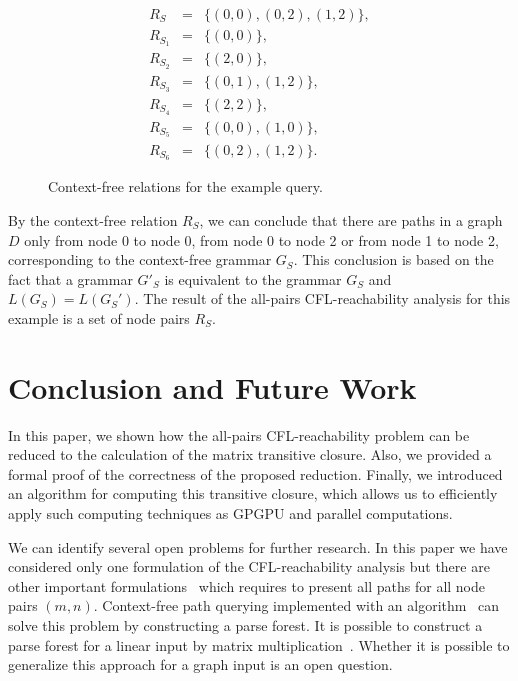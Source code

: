 \documentclass[runningheads,a4paper]{llncs}
\begin{document}
\begin{figure}[h]
	\begin{eqnarray*}
		R_S&=&\{(0,0),(0,2),(1,2)\},\\
		R_{S_1}&=&\{(0,0)\},\\
		R_{S_2}&=&\{(2,0)\}, \\
		R_{S_3}&=&\{(0,1), (1,2)\}, \\
		R_{S_4}&=&\{(2,2)\}, \\
		R_{S_5}&=&\{(0,0), (1,0)\}, \\
		R_{S_6}&=&\{(0,2), (1,2)\}.
	\end{eqnarray*}
	\caption{Context-free relations for the example query.}
	\label{ExampleQueryCFRelations}
\end{figure}

By the context-free relation $R_S$, we can conclude that there are paths in a graph $D$ only from node 0 to node 0, from node 0 to node 2 or from node 1 to node 2, corresponding to the context-free grammar $G_S$. This conclusion is based on the fact that a grammar $G'_S$ is equivalent to the grammar $G_S$ and $L(G_S) = L(G_S')$. The result of the all-pairs CFL-reachability analysis for this example is a set of node pairs $R_S$.


\section{Conclusion and Future Work}%
In this paper, we shown how the all-pairs CFL-reachability problem can be reduced to the calculation of the matrix transitive closure. Also, we provided a formal proof of the correctness of the proposed reduction. Finally, we introduced an algorithm for computing this transitive closure, which allows us to efficiently apply such computing techniques as GPGPU and parallel computations.

We can identify several open problems for further research. In this paper we have considered only one formulation of the CFL-reachability analysis but there are other important formulations~\cite{hellingsPathQuerying} which requires to present all paths for all node pairs $(m,n)$. Context-free path querying implemented with an algorithm~\cite{GLL} can solve this problem by constructing a parse forest. It is possible to construct a parse forest for a linear input by matrix multiplication~\cite{okhotin_cyk}. Whether it is possible to generalize this approach for a graph input is an open question.
\end{document}
